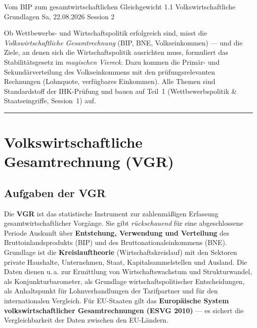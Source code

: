 \documentclass[11pt, a4paper]{article}
\begin{document}
%
  {Vom BIP zum gesamtwirtschaftlichen Gleichgewicht}%
  {1.1 Volkswirtschaftliche Grundlagen}%
  {Sa, 22.08.2026 \textperiodcentered{} Session 2}

\begin{merksatz}[title={\bfseries Worum geht es in Teil 2?}]
Ob Wettbewerbs- und Wirtschaftspolitik erfolgreich sind, misst die
\emph{Volkswirtschaftliche Gesamtrechnung} (BIP, BNE, Volkseinkommen) --- und die Ziele,
an denen sich die Wirtschaftspolitik ausrichten muss, formuliert das Stabilitätsgesetz
im \emph{magischen Viereck}. Dazu kommen die Primär- und Sekundärverteilung des
Volkseinkommens mit den prüfungsrelevanten Rechnungen (Lohnquote, verfügbares
Einkommen). Alle Themen sind Standardstoff der IHK-Prüfung und bauen auf Teil~1
(Wettbewerbspolitik \& Staatseingriffe, Session~1) auf.
\end{merksatz}

\tableofcontents
\vspace{1em}
\hrule
\vspace{1em}

\section{Volkswirtschaftliche Gesamtrechnung (VGR)}

\subsection{Aufgaben der VGR}

Die \textbf{VGR} ist das statistische Instrument zur zahlenmäßigen Erfassung
gesamtwirtschaftlicher Vorgänge. Sie gibt \emph{rückschauend} für eine abgeschlossene
Periode Auskunft über \textbf{Entstehung, Verwendung und Verteilung} des
Bruttoinlandsprodukts (BIP) und des Bruttonationaleinkommens (BNE). Grundlage ist die
\textbf{Kreislauftheorie} (Wirtschaftskreislauf) mit den Sektoren private Haushalte,
Unternehmen, Staat, Kapitalsammelstellen und Ausland. Die Daten dienen u.\,a. zur
Ermittlung von Wirtschaftswachstum und Strukturwandel, als Konjunkturbarometer, als
Grundlage wirtschaftspolitischer Entscheidungen, als Anhaltspunkt für Lohnverhandlungen
der Tarifpartner und für den internationalen Vergleich. Für EU-Staaten gilt das
\textbf{Europäische System volkswirtschaftlicher Gesamtrechnungen (ESVG 2010)} --- es
sichert die Vergleichbarkeit der Daten zwischen den EU-Ländern.
\end{document}
